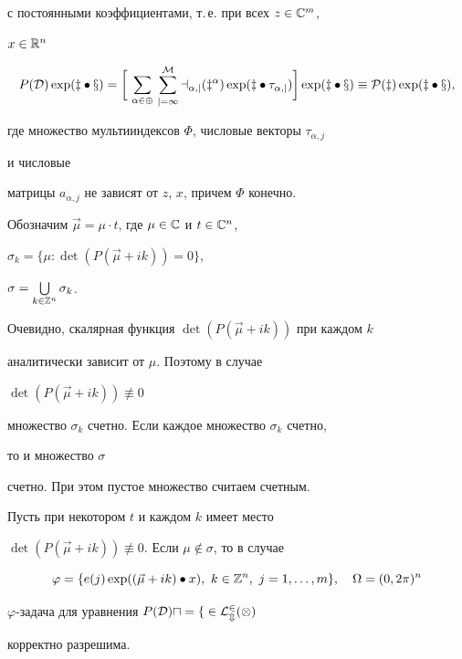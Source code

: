 с постоянными коэффициентами, т.\,е. при всех $z\in\Bbb C^m$, 


$x\in\Bbb R^n$ 


$$ 


P(\cal D)\exp(z\bullet x)=\bigg[\,\sum_{\alpha\in\Phi}\,\sum^M_{j=1} 


a_{\alpha,j}(z^\alpha)\exp(z\bullet\tau_{\alpha,j})\bigg] 


\exp(z\bullet x)\equiv P(z)\exp(z\bullet x), 


$$ 


где множество мультииндексов $\Phi$, числовые векторы $\tau_{\alpha,j}$ 


и числовые  


матрицы $a_{\alpha,j}$ не зависят от $z$, $x$, причем $\Phi$ конечно. 


 


Обозначим $\Vec\mu=\mu\cdot t$, где $\mu\in\Bbb C$ и $t\in\Bbb C^n$, 


$\sigma_k=\{\mu:\det(P(\Vec\mu+ik))=0\}$, 


$\sigma=\bigcup\limits_{k\in\Bbb Z^n}\sigma_k$. 


Очевидно, скалярная функция $\det(P(\Vec\mu+ik))$ при каждом $k$ 


аналитически зависит от $\mu$. Поэтому в случае 


$\det(P(\Vec\mu+ik))\not\equiv0$ 


множество $\sigma_k$ счетно. Если каждое множество $\sigma_k$ счетно, 


то и множество $\sigma$ 


счетно. При этом пустое множество считаем счетным. 


 


\begin{thms} 


Пусть при некотором $t$ и каждом $k$ имеет место 


$\det(P(\Vec\mu+ik))\not\equiv0$. Если $\mu\notin\sigma$, то в случае 


$$ 


\varphi=\{e(j)\exp((\Vec\mu+ik)\bullet x), 


\ k\in\Bbb Z^n,\ j=1,\dotsc,m\},\quad \Omega=(0,2\pi)^n 


$$ 


$\varphi$-задача для уравнения $P(\cal D)u=f\in L^2_m(\Omega)$ 


корректно разрешима.  


\end{thms} 


